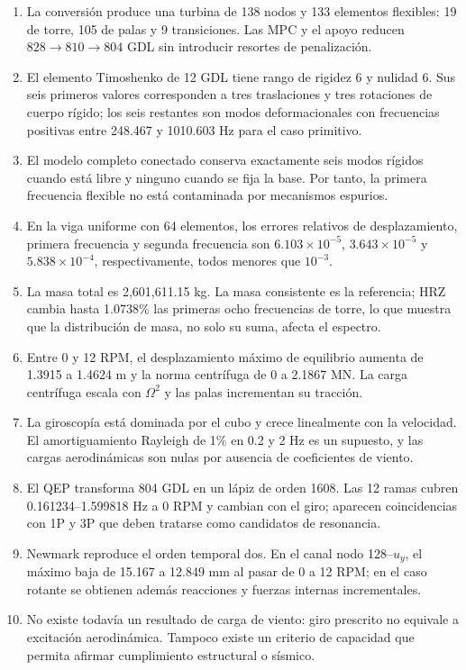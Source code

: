 \documentclass[oneside,a4paper,spanish,links]{amca}
\begin{document}
\begin{enumerate}
\item La conversión produce una turbina de 138 nodos y 133 elementos flexibles: 19 de torre, 105 de palas y 9 transiciones. Las MPC y el apoyo reducen $828\rightarrow810\rightarrow804$ GDL sin introducir resortes de penalización.
\item El elemento Timoshenko de 12 GDL tiene rango de rigidez 6 y nulidad 6. Sus seis primeros valores corresponden a tres traslaciones y tres rotaciones de cuerpo rígido; los seis restantes son modos deformacionales con frecuencias positivas entre 248.467 y 1010.603 Hz para el caso primitivo.
\item El modelo completo conectado conserva exactamente seis modos rígidos cuando está libre y ninguno cuando se fija la base. Por tanto, la primera frecuencia flexible no está contaminada por mecanismos espurios.
\item En la viga uniforme con 64 elementos, los errores relativos de desplazamiento, primera frecuencia y segunda frecuencia son $6.103\times10^{-5}$, $3.643\times10^{-5}$ y $5.838\times10^{-4}$, respectivamente, todos menores que $10^{-3}$.
\item La masa total es 2,601,611.15 kg. La masa consistente es la referencia; HRZ cambia hasta 1.0738\% las primeras ocho frecuencias de torre, lo que muestra que la distribución de masa, no solo su suma, afecta el espectro.
\item Entre 0 y 12 RPM, el desplazamiento máximo de equilibrio aumenta de 1.3915 a 1.4624 m y la norma centrífuga de 0 a 2.1867 MN. La carga centrífuga escala con $\Omega^2$ y las palas incrementan su tracción.
\item La giroscopía está dominada por el cubo y crece linealmente con la velocidad. El amortiguamiento Rayleigh de 1\% en 0.2 y 2 Hz es un supuesto, y las cargas aerodinámicas son nulas por ausencia de coeficientes de viento.
\item El QEP transforma 804 GDL en un lápiz de orden 1608. Las 12 ramas cubren 0.161234--1.599818 Hz a 0 RPM y cambian con el giro; aparecen coincidencias con 1P y 3P que deben tratarse como candidatos de resonancia.
\item Newmark reproduce el orden temporal dos. En el canal nodo 128--$u_y$, el máximo baja de 15.167 a 12.849 mm al pasar de 0 a 12 RPM; en el caso rotante se obtienen además reacciones y fuerzas internas incrementales.
\item No existe todavía un resultado de carga de viento: giro prescrito no equivale a excitación aerodinámica. Tampoco existe un criterio de capacidad que permita afirmar cumplimiento estructural o sísmico.
\end{enumerate}
\end{document}
